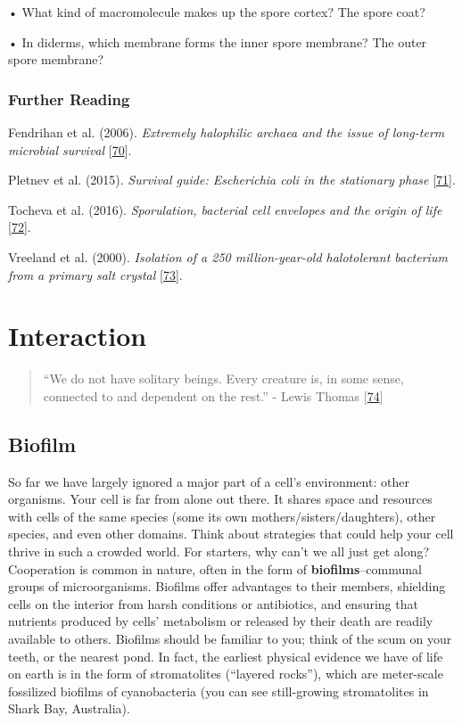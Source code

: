 \documentclass[]{tufte-book}
\begin{document}
• What kind of macromolecule makes up the spore cortex? The spore coat?

• In diderms, which membrane forms the inner spore membrane? The outer spore membrane?

\hypertarget{further-reading-7}{%
\subsection*{Further Reading}\label{further-reading-7}}

Fendrihan et al. (2006). \emph{Extremely halophilic archaea and the issue of long-term microbial survival} {[}\protect\hyperlink{ref-fendrihan2006}{70}{]}.

Pletnev et al. (2015). \emph{Survival guide: Escherichia coli in the stationary phase} {[}\protect\hyperlink{ref-pletnev2015}{71}{]}.

Tocheva et al. (2016). \emph{Sporulation, bacterial cell envelopes and the origin of life} {[}\protect\hyperlink{ref-tocheva2016}{72}{]}.

Vreeland et al. (2000). \emph{Isolation of a 250 million-year-old halotolerant bacterium from a primary salt crystal} {[}\protect\hyperlink{ref-vreeland2000}{73}{]}.

\hypertarget{interaction}{%
\chapter{Interaction}\label{interaction}}

\begin{quote}
``We do not have solitary beings. Every creature is, in some sense, connected to and dependent on the rest.''
- Lewis Thomas {[}\protect\hyperlink{ref-thomas1974}{74}{]}
\end{quote}

\hypertarget{biofilm}{%
\section{Biofilm}\label{biofilm}}

So far we have largely ignored a major part of a cell's environment: other organisms. Your cell is far from alone out there. It shares space and resources with cells of the same species (some its own mothers/sisters/daughters), other species, and even other domains. Think about strategies that could help your cell thrive in such a crowded world. For starters, why can't we all just get along? Cooperation is common in nature, often in the form of \textbf{biofilms}--communal groups of microorganisms. Biofilms offer advantages to their members, shielding cells on the interior from harsh conditions or antibiotics, and ensuring that nutrients produced by cells' metabolism or released by their death are readily available to others. Biofilms should be familiar to you; think of the scum on your teeth, or the nearest pond. In fact, the earliest physical evidence we have of life on earth is in the form of stromatolites (``layered rocks''), which are meter-scale fossilized biofilms of cyanobacteria (you can see still-growing stromatolites in Shark Bay, Australia).
\end{document}
